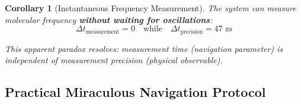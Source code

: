 \documentclass[12pt,a4paper]{article}
\newtheorem{corollary}[theorem]{Corollary}
\begin{document}
\begin{corollary}[Instantaneous Frequency Measurement]
The system can measure molecular frequency \textbf{without waiting for oscillations}:
\begin{equation}
\Delta t_{\text{measurement}} = 0 \quad \text{while} \quad \Delta t_{\text{precision}} = 47 \text{ zs}
\end{equation}

This apparent paradox resolves: measurement time (navigation parameter) is independent of measurement precision (physical observable).
\end{corollary}

\subsection{Practical Miraculous Navigation Protocol}
\end{document}
